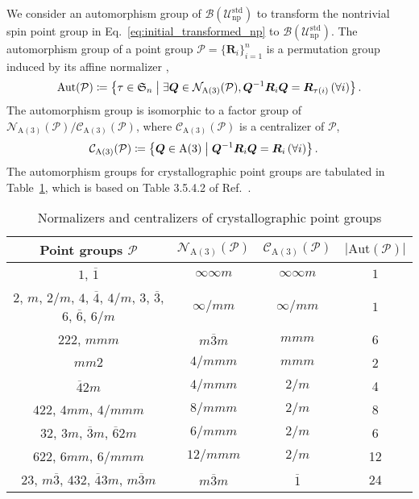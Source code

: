 We consider an automorphism group of $\mathcal{B}(\mathcal{U}_{\mathrm{np}}^{\mathrm{std}})$ to transform the nontrivial spin point group in Eq.~\eqref{eq:initial_transformed_np} to $\mathcal{B}(\mathcal{U}_{\mathrm{np}}^{\mathrm{std}})$.
The automorphism group of a point group $\mathcal{P} = \{ \bm{R}_{i} \}_{i=1}^{n}$ is a permutation group induced by its affine normalizer \cite{Gubler1982},
\begin{align}
  \mathrm{Aut}(\mathcal{P})
    \coloneqq \left\{ \tau \in \mathfrak{S}_{n}  \mathrel{}\middle|\mathrel{}  \exists \bm{Q} \in \mathcal{N}_{\mathrm{A}(3)}(\mathcal{P}), \bm{Q}^{-1}\bm{R}_{i}\bm{Q} = \bm{R}_{\tau(i)} \, (\forall i)  \right\}.
\end{align}
The automorphism group is isomorphic to a factor group of $\mathcal{N}_{\mathrm{A}(3)}(\mathcal{P}) / \mathcal{C}_{\mathrm{A}(3)}(\mathcal{P})$, where $\mathcal{C}_{\mathrm{A}(3)}(\mathcal{P})$ is a centralizer of $\mathcal{P}$,
\begin{align}
  \mathcal{C}_{\mathrm{A}(3)}(\mathcal{P})
    &\coloneqq \left\{  \bm{Q} \in \mathrm{A}(3)  \mathrel{}\middle|\mathrel{}  \bm{Q}^{-1} \bm{R}_{i} \bm{Q} = \bm{R}_{i} \, (\forall i)  \right\}.
\end{align}
The automorphism groups for crystallographic point groups are tabulated in Table~\ref{tab:normalizer_centralizer_pg}, which is based on Table 3.5.4.2 of Ref.~\cite{koch2016normalizers}.

\begin{table}[tb]
  \centering
  \caption{Normalizers and centralizers of crystallographic point groups}
  \label{tab:normalizer_centralizer_pg}
  \begin{tabular}{cccc}
    \hline \hline
    Point groups $\mathcal{P}$
      & $\mathcal{N}_{\mathrm{A}(3)}(\mathcal{P})$
      & $\mathcal{C}_{\mathrm{A}(3)}(\mathcal{P})$
      & $ | \mathrm{Aut}(\mathcal{P}) | $ \\
    \hline
    $1$, $\overline{1}$ & $\infty\infty m$ & $\infty\infty m$ & $1$ \\
    $2$, $m$, $2/m$, $4$, $\overline{4}$, $4/m$, $3$, $\overline{3}$, $6$, $\overline{6}$, $6/m$
      & $\infty / m m$ & $\infty / m m$ & $1$ \\
    $222$, $mmm$ & $m\overline{3}m$ & $mmm$ & 6 \\
    $mm2$ & $4/mmm$ & $mmm$ & 2 \\ %
    $\overline{4}2m$ & $4/mmm$ & $2/m$ & 4 \\
    $422$, $4mm$, $4/mmm$ & $8/mmm$ & $2/m$ & 8 \\
    $32$, $3m$, $\overline{3}m$, $\overline{6}2m$ & $6/mmm$ & $2/m$ & 6 \\
    $622$, $6mm$, $6/mmm$ & $12/mmm$ & $2/m$ & 12 \\
    $23$, $m\overline{3}$, $432$, $\overline{4}3m$, $m\overline{3}m$
      & $m\overline{3}m$ & $\overline{1}$ & 24 \\ %
    \hline \hline
  \end{tabular}
\end{table}

